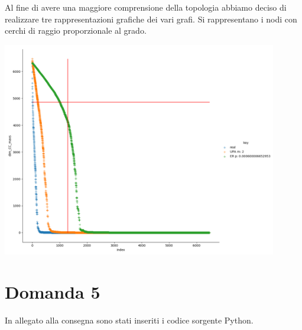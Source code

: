 \documentclass{article}
\begin{document}
Al fine di avere una maggiore comprensione della topologia abbiamo deciso di realizzare tre rappresentazioni grafiche dei vari grafi. Si rappresentano i nodi con cerchi di raggio proporzionale al grado.

\includegraphics[width=0.9\textwidth]{../grafici/Figure_1}

\section*{Domanda 5}
In allegato alla consegna sono stati inseriti i codice sorgente Python.
    
\end{document}
